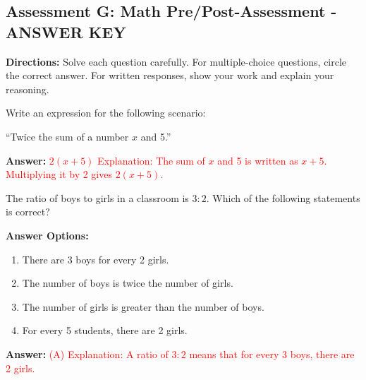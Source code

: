 \documentclass[12pt]{article}
\begin{document}
\subsection*{Assessment G: Math Pre/Post-Assessment - ANSWER KEY}
\onehalfspacing

\begin{tcolorbox}[colframe=black!50, colback=white, title=Assessment Directions]
\textbf{Directions:} Solve each question carefully. For multiple-choice questions, circle the correct answer. For written responses, show your work and explain your reasoning.
\end{tcolorbox}

\begin{tcolorbox}[colframe=black!50, colback=white, title=\textbf{Problem 1 (6.EE.A.2)}]
Write an expression for the following scenario: 

``Twice the sum of a number \(x\) and 5.'' 

\textbf{Answer:} \textcolor{red}{\(2(x + 5)\)}  
\textcolor{red}{Explanation: The sum of \(x\) and 5 is written as \(x + 5\). Multiplying it by 2 gives \(2(x + 5)\).}
\end{tcolorbox}

\begin{tcolorbox}[colframe=black!50, colback=white, title=\textbf{Problem 2 (6.RP.A.1)}]
The ratio of boys to girls in a classroom is \(3:2\). Which of the following statements is correct?

\textbf{Answer Options:}
\begin{enumerate}[label=(\Alph*), itemsep=0.5cm]
    \item There are 3 boys for every 2 girls.
    \item The number of boys is twice the number of girls.
    \item The number of girls is greater than the number of boys.
    \item For every 5 students, there are 2 girls.
\end{enumerate}
\textbf{Answer:} \textcolor{red}{(A)}  
\textcolor{red}{Explanation: A ratio of \(3:2\) means that for every 3 boys, there are 2 girls.}
\end{tcolorbox}
\end{document}
